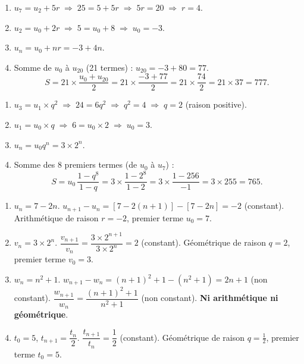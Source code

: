 \documentclass[11pt]{article}
\newcommand{\cle}[1]{{\popxbold\color{popdark}#1}}
\begin{document}
\begin{corrige}
\begin{enumerate}
\item $u_7 = u_2 + 5r \;\Rightarrow\; 25 = 5 + 5r \;\Rightarrow\; 5r = 20 \;\Rightarrow\; r = 4$.
\item $u_2 = u_0 + 2r \;\Rightarrow\; 5 = u_0 + 8 \;\Rightarrow\; u_0 = -3$.
\item $u_n = u_0 + nr = -3 + 4n$.
\item Somme de $u_0$ à $u_{20}$ (21 termes) : $u_{20} = -3 + 80 = 77$.
  \[
  S = 21 \times \frac{u_0+u_{20}}{2} = 21 \times \frac{-3+77}{2} = 21 \times \frac{74}{2} = 21 \times 37 = 777.
  \]
\end{enumerate}
\end{corrige}

\begin{corrige}
\begin{enumerate}
\item $u_3 = u_1 \times q^2 \;\Rightarrow\; 24 = 6 q^2 \;\Rightarrow\; q^2 = 4 \;\Rightarrow\; q = 2$ (raison positive).
\item $u_1 = u_0 \times q \;\Rightarrow\; 6 = u_0 \times 2 \;\Rightarrow\; u_0 = 3$.
\item $u_n = u_0 q^n = 3 \times 2^n$.
\item Somme des 8 premiers termes (de $u_0$ à $u_7$) :
  \[
  S = u_0\,\frac{1-q^8}{1-q} = 3 \times \frac{1-2^8}{1-2} = 3 \times \frac{1-256}{-1} = 3 \times 255 = 765.
  \]
\end{enumerate}
\end{corrige}

\begin{corrige}
\begin{enumerate}
\item $u_n = 7-2n$. $u_{n+1}-u_n = [7-2(n+1)] - [7-2n] = -2$ (constant). \cle{Arithmétique} de raison $r=-2$, premier terme $u_0=7$.
\item $v_n = 3 \times 2^n$. $\dfrac{v_{n+1}}{v_n} = \dfrac{3\times2^{n+1}}{3\times2^n} = 2$ (constant). \cle{Géométrique} de raison $q=2$, premier terme $v_0=3$.
\item $w_n = n^2+1$. $w_{n+1}-w_n = (n+1)^2+1 - (n^2+1) = 2n+1$ (non constant). $\dfrac{w_{n+1}}{w_n} = \dfrac{(n+1)^2+1}{n^2+1}$ (non constant). \textbf{Ni arithmétique ni géométrique}.
\item $t_0=5$, $t_{n+1} = \dfrac{t_n}{2}$. $\dfrac{t_{n+1}}{t_n} = \dfrac{1}{2}$ (constant). \cle{Géométrique} de raison $q=\frac12$, premier terme $t_0=5$.
\end{enumerate}
\end{corrige}
\end{document}
